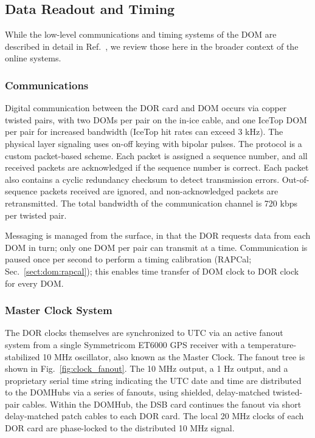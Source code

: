 \subsection{Data Readout and Timing}

While the low-level communications and timing systems of the DOM are
described in detail in Ref.~\cite{ICECUBE:DAQ}, we review those here in
the broader context of the online systems.

\subsubsection{\label{sect:online:comms}Communications}

Digital communication between the DOR card and DOM occurs via copper
twisted pairs, with two DOMs per pair on the in-ice cable, and one IceTop
DOM per pair for increased bandwidth (IceTop hit rates can exceed 3 kHz).
The physical layer signaling uses on-off keying with bipolar pulses.  The
protocol is a custom 
packet-based scheme.  Each packet is assigned a sequence number, and all
received packets are acknowledged if the sequence number is correct.  Each
packet also contains a cyclic redundancy checksum to detect transmission errors.
Out-of-sequence packets received are ignored, and non-acknowledged packets
are retransmitted. The total bandwidth of the communication channel
is 720 kbps per twisted pair.

Messaging is managed from the surface, in that the DOR requests data from
each DOM in turn; only one DOM per pair can transmit at a time.  Communication is
paused once per second to perform a timing calibration (RAPCal; Sec.~\ref{sect:dom:rapcal}); this enables time transfer of DOM clock to DOR
clock for every DOM.  


\subsubsection{\label{sect:online:master_clock}Master Clock System}

The DOR clocks themselves are synchronized to UTC via an active fanout
system from a single Symmetricom ET6000 GPS receiver with a
temperature-stabilized 10 MHz oscillator, also known as the Master
Clock. The fanout tree is shown in
Fig.~\ref{fig:clock_fanout}. The 10 MHz output, a 1 Hz output, and a
proprietary serial time string indicating
the UTC date and time are distributed to the DOMHubs via a series of
fanouts, using shielded, delay-matched twisted-pair cables.  Within the
DOMHub, the DSB card continues the fanout via short delay-matched patch
cables to each DOR card.  The local 20 MHz clocks of each DOR card are
phase-locked to the distributed 10 MHz signal.  

